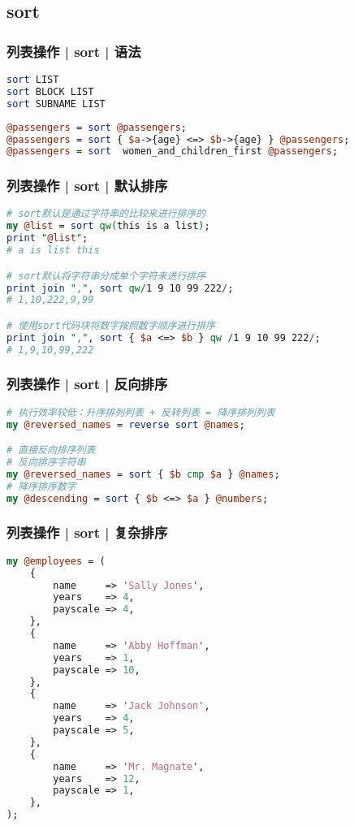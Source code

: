 \subsection{sort}
\begin{frame}[fragile]
  \frametitle{列表操作 | sort | \alert{语法}}
\begin{lstlisting}[language=Perl]
sort LIST
sort BLOCK LIST
sort SUBNAME LIST
\end{lstlisting}
  \pause
\begin{lstlisting}[language=Perl]
@passengers = sort @passengers;
@passengers = sort { $a->{age} <=> $b->{age} } @passengers;
@passengers = sort  women_and_children_first @passengers;
\end{lstlisting}
\end{frame}

\begin{frame}[fragile]
  \frametitle{列表操作 | sort | \alert{默认排序}}
\begin{lstlisting}[language=Perl]
# sort默认是通过字符串的比较来进行排序的
my @list = sort qw(this is a list);
print "@list";
# a is list this

# sort默认将字符串分成单个字符来进行排序
print join ",", sort qw/1 9 10 99 222/;
# 1,10,222,9,99

# 使用sort代码块将数字按照数字顺序进行排序
print join ",", sort { $a <=> $b } qw /1 9 10 99 222/;
# 1,9,10,99,222
\end{lstlisting}
\end{frame}

\begin{frame}[fragile]
  \frametitle{列表操作 | sort | \alert{反向排序}}
\begin{lstlisting}[language=Perl]
# 执行效率较低：升序排列列表 + 反转列表 = 降序排列列表
my @reversed_names = reverse sort @names;

# 直接反向排序列表
# 反向排序字符串
my @reversed_names = sort { $b cmp $a } @names;
# 降序排序数字
my @descending = sort { $b <=> $a } @numbers;
\end{lstlisting}
\end{frame}

\begin{frame}[fragile]
  \frametitle{列表操作 | sort | 复杂排序}
\begin{lstlisting}[language=Perl,basicstyle=\scriptsize\tt]
my @employees = (
    {
        name     => 'Sally Jones',
        years    => 4,
        payscale => 4,
    },
    {
        name     => 'Abby Hoffman',
        years    => 1,
        payscale => 10,
    },
    {
        name     => 'Jack Johnson',
        years    => 4,
        payscale => 5,
    },
    {
        name     => 'Mr. Magnate',
        years    => 12,
        payscale => 1,
    },
);
\end{lstlisting}
\end{frame}


